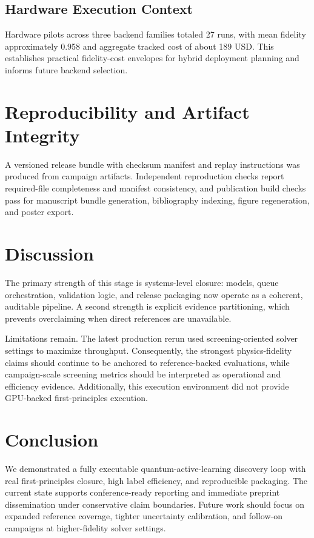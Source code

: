 \documentclass[11pt]{article}
\begin{document}
\subsection{Hardware Execution Context}
Hardware pilots across three backend families totaled 27 runs, with mean fidelity approximately 0.958 and aggregate tracked cost of about 189 USD. This establishes practical fidelity-cost envelopes for hybrid deployment planning and informs future backend selection.

\section{Reproducibility and Artifact Integrity}
A versioned release bundle with checksum manifest and replay instructions was produced from campaign artifacts. Independent reproduction checks report required-file completeness and manifest consistency, and publication build checks pass for manuscript bundle generation, bibliography indexing, figure regeneration, and poster export.

\section{Discussion}
The primary strength of this stage is systems-level closure: models, queue orchestration, validation logic, and release packaging now operate as a coherent, auditable pipeline. A second strength is explicit evidence partitioning, which prevents overclaiming when direct references are unavailable.

Limitations remain. The latest production rerun used screening-oriented solver settings to maximize throughput. Consequently, the strongest physics-fidelity claims should continue to be anchored to reference-backed evaluations, while campaign-scale screening metrics should be interpreted as operational and efficiency evidence. Additionally, this execution environment did not provide GPU-backed first-principles execution.

\section{Conclusion}
We demonstrated a fully executable quantum-active-learning discovery loop with real first-principles closure, high label efficiency, and reproducible packaging. The current state supports conference-ready reporting and immediate preprint dissemination under conservative claim boundaries. Future work should focus on expanded reference coverage, tighter uncertainty calibration, and follow-on campaigns at higher-fidelity solver settings.



\end{document}
